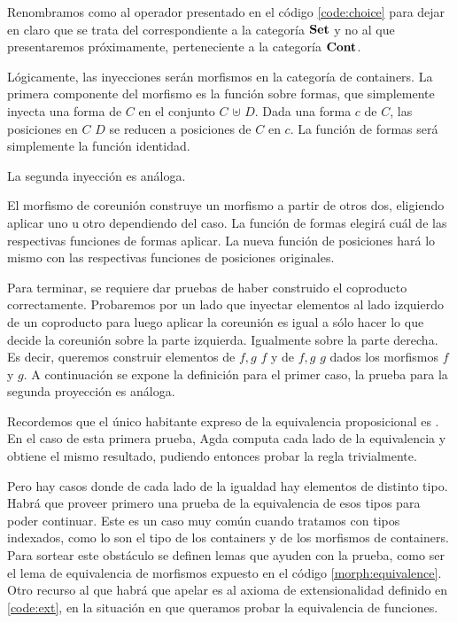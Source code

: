 
Renombramos como \AgdaFunction{$[\_,\_]_{\Set}$} al operador \AgdaFunction{[\_,\_]} presentado en el código \ref{code:choice} para dejar en claro que se trata del correspondiente a la categoría $\mathbf{Set}$ y no al que presentaremos próximamente, perteneciente a la categoría $\mathbf{Cont}$.

Lógicamente, las inyecciones serán morfismos en la categoría de containers. La primera componente del morfismo es la función sobre formas, que simplemente inyecta una forma de $C$ en el conjunto \Sh $C$ $\uplus$ \Sh $D$. Dada una forma $c$ de $C$, las posiciones en  $C$ $D$ se reducen a posiciones de $C$ en $c$. La función de formas será simplemente la función identidad.


La segunda inyección es análoga.

El morfismo de coreunión construye un morfismo a partir de otros dos, eligiendo aplicar uno u otro dependiendo del caso. La función de formas elegirá cuál de las respectivas funciones de formas aplicar. La nueva función de posiciones hará lo mismo con las respectivas funciones de posiciones originales. 


Para terminar, se requiere dar pruebas de haber construido el coproducto correctamente. Probaremos por un lado que
inyectar elementos al lado izquierdo de un coproducto para luego aplicar la coreunión es igual a sólo hacer lo que decide la coreunión sobre la parte izquierda. Igualmente sobre la parte derecha.
Es decir, queremos construir elementos de \AgdaFunction{$[$} $f , g$ \AgdaFunction{$]\ \circ\ \iota_{1} \cong$} $f$ y de \AgdaFunction{$[$} $f , g$ \AgdaFunction{$]\ \circ\ \iota_{2} \cong$} $g$ dados los morfismos $f$ y $g$. A continuación se expone la definición para el primer caso, la prueba para la segunda proyección es análoga.




Recordemos que el único habitante expreso de la equivalencia proposicional es . En el caso de esta primera prueba, Agda computa cada lado de la equivalencia y obtiene el mismo resultado, pudiendo entonces probar la regla trivialmente.

Pero hay casos donde de cada lado de la igualdad hay elementos de distinto tipo. Habrá que proveer primero una prueba de la equivalencia de esos tipos para poder continuar. Este es un caso muy común cuando tratamos con tipos indexados, como lo son el tipo de los containers y de los morfismos de containers. Para sortear este obstáculo se definen lemas que ayuden con la prueba, como ser el lema de equivalencia de morfismos expuesto en el código \ref{morph:equivalence}. Otro recurso al que habrá que apelar es al axioma de extensionalidad definido en \ref{code:ext}, en la situación en que queramos probar la equivalencia de funciones.

